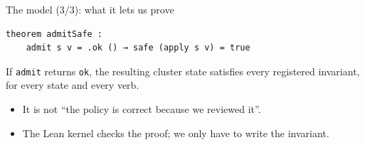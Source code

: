 \documentclass[10pt,aspectratio=169]{beamer}
\begin{document}
\begin{frame}[fragile]{The model (3/3): what it lets us prove}
\begin{lstlisting}
theorem admitSafe :
    admit s v = .ok () → safe (apply s v) = true
\end{lstlisting}
\vspace{0.6em}
If \texttt{admit} returns \texttt{ok}, the resulting cluster state satisfies every registered invariant, for every state and every verb.
\vspace{0.6em}
\begin{itemize}\itemsep0.2em
  \item It is not ``the policy is correct because we reviewed it''.
  \item The Lean kernel checks the proof; we only have to write the invariant.
\end{itemize}
\end{frame}
\end{document}
